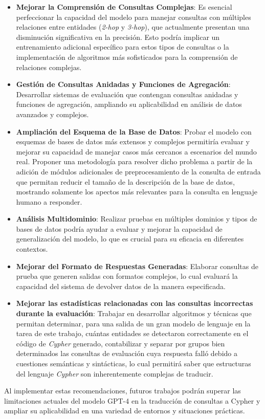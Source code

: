 \begin{itemize}
   \item \textbf{Mejorar la Comprensión de Consultas Complejas}: Es esencial perfeccionar la capacidad del modelo para manejar consultas con múltiples relaciones entre entidades (\textit{2-hop} y \textit{3-hop}), que actualmente presentan una disminución significativa en la precisión. Esto podría implicar un entrenamiento adicional específico para estos tipos de consultas o la implementación de algoritmos más sofisticados para la comprensión de relaciones complejas.

  \item \textbf{Gestión de Consultas Anidadas y Funciones de Agregación}: Desarrollar sistemas de evaluación que contengan consultas anidadas y funciones de agregación, ampliando su aplicabilidad en análisis de datos avanzados y complejos.

   \item \textbf{Ampliación del Esquema de la Base de Datos}: Probar el modelo con esquemas de bases de datos más extensos y complejos permitiría evaluar y mejorar su capacidad de manejar casos más cercanos a escenarios del mundo real. Proponer una metodología para resolver dicho problema a partir de la adición de módulos adicionales de preprocesamiento de la consulta de entrada que permitan reducir el tamaño de la descripción de la base de datos, mostrando solamente los apectos más relevantes para la consulta en lenguaje humano a responder.

   \item \textbf{Análisis Multidominio}: Realizar pruebas en múltiples dominios y tipos de bases de datos podría ayudar a evaluar y mejorar la capacidad de generalización del modelo, lo que es crucial para su eficacia en diferentes contextos.

     \item \textbf{Mejorar del Formato de Respuestas Generadas}: Elaborar consultas de prueba que generen salidas con formatos complejos, lo cual evaluará la capacidad del sistema de devolver datos de la manera especificada.

    \item \textbf{Mejorar las estadísticas relacionadas con las consultas incorrectas durante la evaluación}: Trabajar en desarrollar algoritmos y técnicas que permitan determinar, para una salida de un gran modelo de lenguaje en la tarea de este trabajo, cuántas entidades se detectaron correctamente en el código de \textit{Cypher} generado, contabilizar y separar por grupos bien determinados las consultas de evaluación cuya respuesta falló debido a cuestiones semánticas y sintácticas, lo cual permitirá saber que estructuras del lenguaje \textit{Cypher} son inherentemente complejas de traducir.

\end{itemize}

Al implementar estas recomendaciones, futuros trabajos podrán superar las limitaciones actuales del modelo GPT-4 en la traducción de consultas a Cypher y ampliar su aplicabilidad en una variedad de entornos y situaciones prácticas.